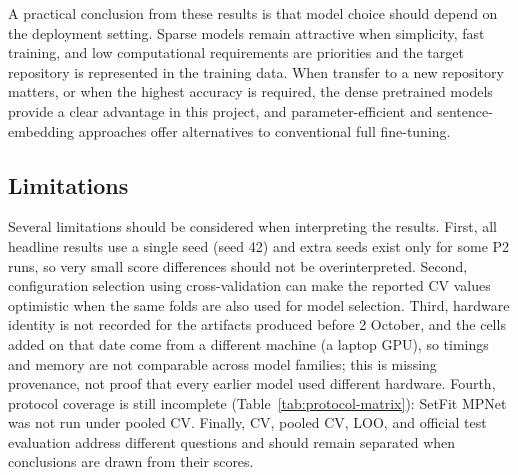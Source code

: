 A practical conclusion from these results is that model choice should depend on the deployment setting. Sparse models remain attractive when simplicity, fast training, and low computational requirements are priorities and the target repository is represented in the training data. When transfer to a new repository matters, or when the highest accuracy is required, the dense pretrained models provide a clear advantage in this project, and parameter-efficient and sentence-embedding approaches offer alternatives to conventional full fine-tuning.

\subsection{Limitations}
Several limitations should be considered when interpreting the results. First, all headline results use a single seed (seed 42) and extra seeds exist only for some P2 runs, so very small score differences should not be overinterpreted. Second, configuration selection using cross-validation can make the reported CV values optimistic when the same folds are also used for model selection. Third, hardware identity is not recorded for the artifacts produced before 2 October, and the cells added on that date come from a different machine (a laptop GPU), so timings and memory are not comparable across model families; this is missing provenance, not proof that every earlier model used different hardware. Fourth, protocol coverage is still incomplete (Table~\ref{tab:protocol-matrix}): SetFit MPNet was not run under pooled CV. Finally, CV, pooled CV, LOO, and official test evaluation address different questions and should remain separated when conclusions are drawn from their scores.
